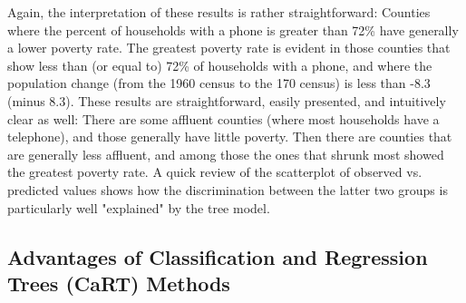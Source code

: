 \documentclass[caret-main.tex]{subfiles}
\begin{document}

Again, the interpretation of these results is rather straightforward: Counties where the percent of households with a phone is greater than 72\% have generally a lower poverty rate. The greatest poverty rate is evident in those counties that show less than (or equal to) 72\% of households with a phone, and where the population change (from the 1960 census to the 170 census) is less than -8.3 (minus 8.3). These results are straightforward, easily presented, and intuitively clear as well: There are some affluent counties (where most households have a telephone), and those generally have little poverty. Then there are counties that are generally less affluent, and among those the ones that shrunk most showed the greatest poverty rate. A quick review of the scatterplot of observed vs. predicted values shows how the discrimination between the latter two groups is particularly well "explained" by the tree model.

\subsection{Advantages of Classification and Regression Trees (CaRT) Methods}
\end{document}
